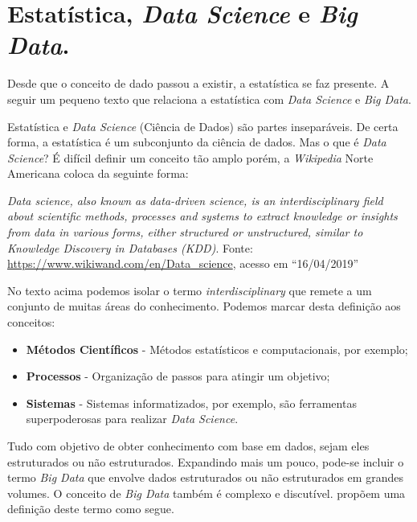 \documentclass[11pt,]{style/krantz}
\providecommand{\tightlist}{%
  \setlength{\itemsep}{0pt}\setlength{\parskip}{0pt}}
\renewenvironment{quote}{\begin{VF}}{\end{VF}}
\theoremstyle{definition}
\theoremstyle{definition}
\theoremstyle{definition}
\theoremstyle{remark}
\begin{document}
\hypertarget{estatistica-data-science-e-big-data.}{%
\section{\texorpdfstring{Estatística, \emph{Data Science} e \emph{Big Data}.}{Estatística, Data Science e Big Data.}}\label{estatistica-data-science-e-big-data.}}

Desde que o conceito de dado passou a existir, a estatística se faz presente. A seguir um pequeno texto que relaciona a estatística com \emph{Data Science} e \emph{Big Data}.

Estatística e \emph{Data Science} (Ciência de Dados) são partes inseparáveis. De certa forma, a estatística é um subconjunto da ciência de dados. Mas o que é \emph{Data Science}? É difícil definir um conceito tão amplo porém, a \emph{Wikipedia} Norte Americana coloca da seguinte forma:

\begin{quote}
\emph{Data science, also known as data-driven science, is an interdisciplinary field about scientific methods, processes and systems to extract knowledge or insights from data in various forms, either structured or unstructured, similar to Knowledge Discovery in Databases (KDD)}. Fonte: \url{https://www.wikiwand.com/en/Data_science}, acesso em ``16/04/2019''
\end{quote}

No texto acima podemos isolar o termo \emph{interdisciplinary} que remete a um conjunto de muitas áreas do conhecimento. Podemos marcar desta definição aos conceitos:

\begin{itemize}
\tightlist
\item
  \textbf{Métodos Científicos} - Métodos estatísticos e computacionais, por exemplo;
\item
  \textbf{Processos} - Organização de passos para atingir um objetivo;
\item
  \textbf{Sistemas} - Sistemas informatizados, por exemplo, são ferramentas superpoderosas para realizar \emph{Data Science}.
\end{itemize}

Tudo com objetivo de obter conhecimento com base em dados, sejam eles estruturados ou não estruturados. Expandindo mais um pouco, pode-se incluir o termo \emph{Big Data} que envolve dados estruturados ou não estruturados em grandes volumes. O conceito de \emph{Big Data} também é complexo e discutível. \citep{de2016formal} propõem uma definição deste termo como segue.
\end{document}
